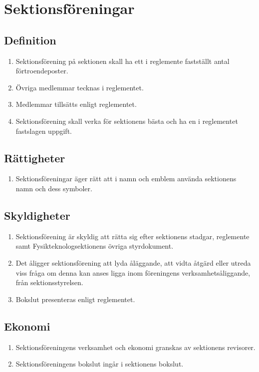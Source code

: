 \documentclass[11pt,a4paper]{article}
\begin{document}
\newpage

\section{Sektionsföreningar}

\subsection{Definition}
\begin{enumerate}[\thesubsection.1]
    \item Sektionsförening på sektionen skall ha ett i reglemente fastställt antal förtroendeposter.
    \item Övriga medlemmar tecknas i reglementet.
    \item Medlemmar tillsätts enligt reglementet.
    \item Sektionsförening skall verka för sektionens bästa och ha en i reglementet fastslagen uppgift.
\end{enumerate}

\subsection{Rättigheter}
\begin{enumerate}[\thesubsection.1]
    \item Sektionsföreningar äger rätt att i namn och emblem använda sektionens namn och dess symboler.
\end{enumerate}

\subsection{Skyldigheter}
\begin{enumerate}[\thesubsection.1]
    \item Sektionsförening är skyldig att rätta sig efter sektionens stadgar, reglemente samt Fysikteknologsektionens övriga styrdokument.
    \item Det åligger sektionsförening att lyda åläggande, att vidta åtgärd eller utreda viss fråga om denna kan anses ligga inom föreningens verksamhetsåliggande, från sektionsstyrelsen.
    \item Bokslut presenteras enligt reglementet.
\end{enumerate}

\subsection{Ekonomi}
\begin{enumerate}[\thesubsection.1]
    \item Sektionsföreningens verksamhet och ekonomi granskas av sektionens revisorer.
    \item Sektionsföreningens bokslut ingår i sektionens bokslut.
\end{enumerate}
\end{document}
